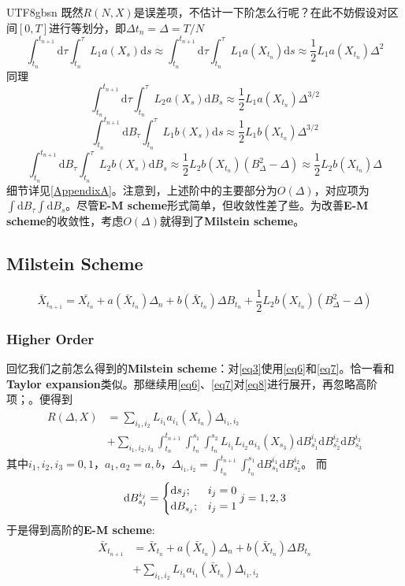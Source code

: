 \documentclass{article}
\begin{document}
\begin{CJK*}{UTF8}{gbsn}
既然$R(N,X)$是误差项，不估计一下阶怎么行呢？在此不妨假设对区间$[0,T]$进行等划分，即$\Delta t_n=\Delta=T/N$
$$
\int_{t_n}^{t_{n+1}}\mathrm{d}\tau\int_{t_n}^\tau L_1a(X_s)\mathrm{d}s\approx
\int_{t_n}^{t_{n+1}}\mathrm{d}\tau\int_{t_n}^\tau L_1a(X_{t_n})\mathrm{d}s\approx
\frac{1}{2}L_1a(X_{t_n})\Delta^2
$$
同理
\begin{equation}
\int_{t_n}^{t_{n+1}}\mathrm{d}\tau\int_{t_n}^\tau L_2a(X_s)\mathrm{d}B_s\approx
\frac{1}{2}L_1a(X_{t_n})\Delta^{3/2}
\label{eq5}\end{equation}
$$
\int_{t_n}^{t_{n+1}}\mathrm{d}B_\tau\int_{t_n}^\tau L_1b(X_s)\mathrm{d}s\approx
\frac{1}{2}L_1b(X_{t_n})\Delta^{3/2}
$$
$$
\int_{t_n}^{t_{n+1}}\mathrm{d}B_\tau\int_{t_n}^\tau L_2b(X_s)\mathrm{d}B_s\approx
\frac{1}{2}L_2b(X_{t_n})(B_\Delta^2-\Delta)\approx
\frac{1}{2}L_2b(X_{t_n})\Delta
$$
细节详见\ref{AppendixA}。注意到，上述阶中的主要部分为$O(\Delta)$，对应项为$\int\mathrm{d}B_\tau\int\mathrm{d}B_s$。尽管\textbf{E-M scheme}形式简单，但收敛性差了些。为改善\textbf{E-M scheme}的收敛性，考虑$O(\Delta)$就得到了\textbf{Milstein scheme}。

\subsection{Milstein Scheme}
$$
\bar{X}_{t_{n+1}}=\bar{X_{t_n}}+a(\bar{X}_{t_{n}})\Delta_n+b(\bar{X}_{t_{n}})\Delta B_{t_n}+\frac{1}{2}L_2b(X_{t_n})(B_\Delta^2-\Delta)    
$$

\subsubsection{Higher Order}
回忆我们之前怎么得到的\textbf{Milstein scheme}：对\ref{eq3}使用\ref{eq6}和\ref{eq7}。恰一看和\textbf{Taylor expansion}类似。那继续用\ref{eq6}、\ref{eq7}对\ref{eq8}进行展开，再忽略高阶项；。便得到
$$\begin{aligned}
R(\Delta,X)
&=\sum_{i_1,i_2}L_{i_1}a_{i_1}(X_{t_n})\Delta_{i_1,i_2}\\
&+\sum_{i_1,i_2,i_3}\int_{t_n}^{t_{n+1}}\int_{t_n}^{s_1}\int_{t_n}^{s_2}L_{i_1}L_{i_2}a_{i_3}(X_{s_3})\mathrm{d}B_{s_1}^{i_1}\mathrm{d}B_{s_2}^{i_2}\mathrm{d}B_{s_3}^{i_3}
\end{aligned}$$
其中$i_1,i_2,i_3=0,1$，$a_1,a_2=a,b$，$\Delta_{i_1,i_2}=\int_{t_n}^{t_{n+1}}\int_{t_n}^{s_1}\mathrm{d}B_{s_1}^{i_1}\mathrm{d}B_{s_2}^{i_2}$。
而
$$\mathrm{d}B_{s_j}^{i_j}=\begin{cases}
\mathrm{d}s_j;&i_j=0\\
\mathrm{d}B_{s_j};&i_j=1
\end{cases}
\space j=1,2,3
$$
于是得到高阶的\textbf{E-M scheme}:
$$
\begin{aligned}
    \bar{X}_{t_{n+1}}
    &=\bar{X}_{t_n}+a(\bar{X}_{t_{n}})\Delta_n+b(\bar{X}_{t_{n}})\Delta B_{t_n}\\
    &+\sum_{i_1,i_2}L_{i_1}a_{i_1}(\bar{X}_{t_n})\Delta_{i_1,i_2}
\end{aligned}
$$

\end{CJK*}
\end{document}
